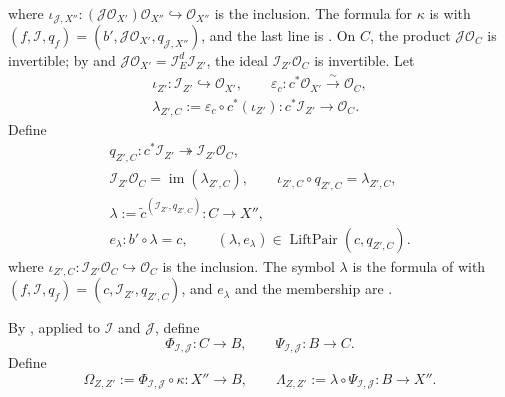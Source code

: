 \begin{definition}
\[\begin{gathered}
  \end{gathered}                                             \tag{CB0}
  \]
  where
  $\iota_{\mathcal J,X''}\colon
  (\mathcal J\mathcal O_{X'})\mathcal O_{X''}
  \hookrightarrow\mathcal O_{X''}$ is the inclusion.  The formula for
  $\kappa$ is
   with
  $(f,\mathcal I,q_f)=(b',\mathcal J\mathcal O_{X'},
  q_{\mathcal J,X''})$, and the last line is
  .  On $C$, the product
  $\mathcal J\mathcal O_C$ is invertible; by
   and
  $\mathcal J\mathcal O_{X'}=\mathcal I_E^d\mathcal I_{Z'}$, the ideal
  $\mathcal I_{Z'}\mathcal O_C$ is invertible.  Let
  \[
  \begin{gathered}
    \iota_{Z'}\colon\mathcal I_{Z'}\hookrightarrow\mathcal O_{X'},\qquad
    \varepsilon_c\colon c^*\mathcal O_{X'}
      \xrightarrow{\ \sim\ }\mathcal O_C,\\
    \lambda_{Z',C}:=\varepsilon_c\circ c^*(\iota_{Z'})
      \colon c^*\mathcal I_{Z'}\longrightarrow\mathcal O_C.
  \end{gathered}                                               \tag{CBb}
  \]
  Define
  \[
  \begin{gathered}
    q_{Z',C}\colon c^*\mathcal I_{Z'}
      \twoheadrightarrow\mathcal I_{Z'}\mathcal O_C,\\
    \mathcal I_{Z'}\mathcal O_C
      =\operatorname{im}(\lambda_{Z',C}),\qquad
    \iota_{Z',C}\circ q_{Z',C}=\lambda_{Z',C},\\
    \lambda:=
      \widetilde c^{(\mathcal I_{Z'},q_{Z',C})}
      \colon C\longrightarrow X'',\\
    e_\lambda\colon b'\circ\lambda=c,\qquad
    (\lambda,e_\lambda)\in\operatorname{LiftPair}(c,q_{Z',C}).
  \end{gathered}                                             \tag{CB1}
  \]
  where
  $\iota_{Z',C}\colon\mathcal I_{Z'}\mathcal O_C
  \hookrightarrow\mathcal O_C$ is the inclusion.  The symbol $\lambda$ is
  the formula of
   with
  $(f,\mathcal I,q_f)=(c,\mathcal I_{Z'},q_{Z',C})$, and
  $e_\lambda$ and the membership are
  .

  By , applied to
  $\mathcal I$ and $\mathcal J$, define
  \[
    \Phi_{\mathcal I,\mathcal J}\colon C\to B,\qquad
    \Psi_{\mathcal I,\mathcal J}\colon B\to C.
  \]
  Define
  \[
    \Omega_{Z,Z'}:=
      \Phi_{\mathcal I,\mathcal J}\circ\kappa\colon X''\longrightarrow B,
    \qquad
    \Lambda_{Z,Z'}:=
      \lambda\circ\Psi_{\mathcal I,\mathcal J}\colon B\longrightarrow X''.
  \]
\end{definition}

